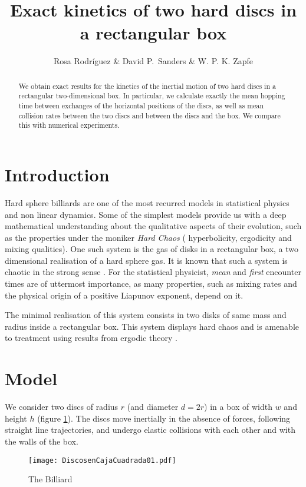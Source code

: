 \documentclass[a4paper,10pt]{article}
\title{Exact kinetics of two hard discs in a rectangular box}
\author{Rosa Rodríguez \& David P.~Sanders \& W. P. K. Zapfe}
\affil{Departamento de Física, Facultad de Ciencias, Universidad Nacional Autónoma de México, Ciudad Universitaria, Del.~Coyoacán, México D.F. 04510, Mexico}
\begin{document}
\maketitle
\begin{abstract}
  We obtain exact results for the kinetics of the inertial motion of 
two hard discs in a rectangular two-dimensional box.
  In particular,  we calculate exactly the mean hopping time between exchanges
 of the horizontal positions of the discs, 
as well as mean collision rates between the two discs and 
 between the discs and the box. We compare this with numerical experiments.
\end{abstract}

\section{Introduction}

Hard sphere billiards are one of the most recurred models in
statistical physics and non linear dynamics.  Some of the simplest models
 provide us with a deep mathematical understanding
about the qualitative aspects of their evolution, such as 
the properties under the moniker \emph{Hard Chaos} (
hyperbolicity, ergodicity and mixing qualities). One such system is the
gas of disks in a rectangular box, a two dimensional realisation of a
hard sphere gas. It is known that such a system is chaotic in the
strong sense \cite{Sinai70}. 
For the statistical physicist, \emph{mean} and \emph{first} encounter
times are of uttermost importance, as many properties,
such as mixing rates and the physical origin of a positive
Liapunov exponent, depend on it. 

The minimal realisation of this
system consists in two disks of same mass and radius inside a 
rectangular box. This system displays hard chaos and 
is amenable to treatment using
results from ergodic theory \cite{Sinai70, Gallavotti74, SzaszBook00}. 


\section{Model}

We consider two discs of radius $r$ (and diameter $d=2r$) 
in a box of width $w$ and height $h$ (figure
\ref{billar01}). 
The discs move inertially in the absence of forces, 
following straight line trajectories,
and undergo elastic collisions with each 
other and with the walls of the box.

\begin{figure}[h]
  \centering
  \texttt{[image: DiscosenCajaCuadrada01.pdf]}
  \caption{The Billiard}\label{billar01}
\end{figure}
\end{document}
